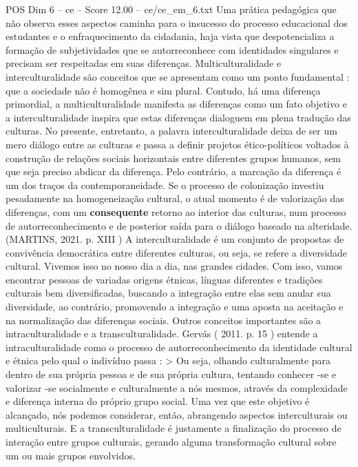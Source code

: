 \begin{textsample}{POS Dim 6 – ce – Score 12.00 – ce/ce\_em\_6.txt}
Uma prática pedagógica que não observa esses aspectos caminha para o insucesso do processo educacional dos estudantes e o enfraquecimento da cidadania, haja vista que despotencializa a formação de subjetividades que se autorreconhece com identidades singulares e precisam ser respeitadas em suas diferenças.
Multiculturalidade e interculturalidade são conceitos que se apresentam como um ponto fundamental : que a sociedade não é homogênea e sim plural.
Contudo, há uma diferença primordial, a multiculturalidade manifesta as diferenças como um fato objetivo e a interculturalidade inspira que estas diferenças dialoguem em plena tradução das culturas.
No presente, entretanto, a palavra interculturalidade deixa de ser um mero diálogo entre as culturas e passa a definir projetos ético-políticos voltados à construção de relações sociais horizontais entre diferentes grupos humanos, sem que seja preciso abdicar da diferença.
Pelo contrário, a marcação da diferença é um dos traços da contemporaneidade.
Se o processo de colonização investiu pesadamente na homogeneização cultural, o atual momento é de valorização das diferenças, com um \textbf{consequente} retorno ao interior das culturas, num processo de autorreconhecimento e de posterior saída para o diálogo baseado na alteridade.(MARTINS, 2021. p.
XIII ) A interculturalidade é um conjunto de propostas de convivência democrática entre diferentes culturas, ou seja, se refere a diversidade cultural.
Vivemos isso no nosso dia a dia, nas grandes cidades.
Com isso, vamos encontrar pessoas de variadas origens étnicas, línguas diferentes e tradições culturais bem diversificadas, buscando a integração entre elas sem anular sua diversidade, ao contrário, promovendo a integração e uma aposta na aceitação e na normalização das diferenças sociais.
Outros conceitos importantes são a intraculturalidade e a transculturalidade.
Gervás ( 2011. p. 15 ) entende a intraculturalidade como o processo de autorreconhecimento da identidade cultural e étnica pelo qual o indivíduo passa : > Ou seja, olhando culturalmente para dentro de sua própria pessoa e de sua própria cultura, tentando conhecer -se e valorizar -se socialmente e culturalmente a nós mesmos, através da complexidade e diferença interna do próprio grupo social.
Uma vez que este objetivo é alcançado, nós podemos considerar, então, abrangendo aspectos interculturais ou multiculturais.
E a transculturalidade é justamente a finalização do processo de interação entre grupos culturais, gerando alguma transformação cultural sobre um ou mais grupos envolvidos.

\end{textsample}
